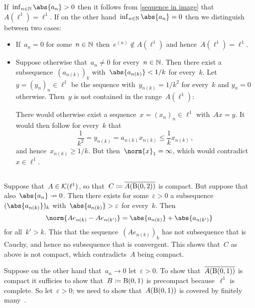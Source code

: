 If~$\inf_{n \in \Natural} \abs{a_n} > 0$ then it follows from \cref{sequence in image} that~$A(\ell^1) = \ell^1$.
If on the other hand~$\inf_{n \in \Natural} \abs{a_n} = 0$ then we distinguish between two cases:
\begin{itemize}
  \item
    If~$a_n = 0$ for some~$n \in \Natural$ then~$e^{(n)} \notin A(\ell^1)$ and hence~$A(\ell^1) = \ell^1$.
  \item
    Suppose otherwise that~$a_n \neq 0$ for every~$n \in \Natural$.
    Then there exist a subsequence~$(a_{n(k)})_k$ with~$\abs{a_{n(k)}} < 1/k$ for every~$k$.
    Let~$y = (y_n)_n \in \ell^1$ be the sequence with~$y_{n(k)} = 1/k^2$ for every~$k$ and $y_n = 0$ otherwise.
    Then~$y$ is not contained in the range~$A(\ell^1)$:
    
    There would otherwise exist a sequence~$x = (x_n)_n \in \ell^1$ with~$Ax = y$.
    It would then follow for every~$k$ that
    \[
            \frac{1}{k^2}
      =     y_{n(k)}
      =     a_{n(k)} x_{n(k)}
      \leq  \frac{1}{k} x_{n(k)} \,,
    \]
    and hence~$x_{n(k)} \geq 1/k$.
    But then~$\norm{x}_1 = \infty$, which would contradict~$x \in \ell^1$.
\end{itemize}





\subsection{}

Suppose that~$A \in \Compact(\ell^1)$, so that~$C \defined \closure{A(\ball{2}{0})}$ is compact.
But suppose that also~$\abs{a_n} \nto 0$.
Then there exists for some~$\varepsilon > 0$ a subsequence~$(\abs{a_{n(k)}})_k$ with~$\abs{a_{n(k)}} > \varepsilon$ for every~$k$.
Then
\[
    \norm{ A e_{n(k)} - A e_{n(k')} }
  = \abs{ a_{n(k)} } + \abs{ a_{n(k')} }
\]
for all~$k' > k$.
This that the sequence~$( A e_{n(k)} )_k$ has not subsequence that is Cauchy, and hence no subsequence that is convergent.
This shows that~$C$ as above is not compact, which contradicts~$A$ being compact.

Suppose on the other hand that~$a_n \to 0$ let~$\varepsilon > 0$.
To show that~$\closure{A(\ball{1}{0})}$ is compact it sufficies to show that~$B \defined \ball{1}{0}$ is precompact because~$\ell^1$ is complete.
So let~$\varepsilon > 0$;
we need to show that~$A(\ball{1}{0})$ is covered by finitely many~.

